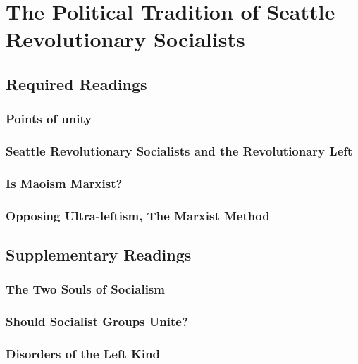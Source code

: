 \documentclass[12pt,a4paper]{report}
\begin{document}
\chapter{The Political Tradition of Seattle Revolutionary Socialists}
\section{Required Readings}
\subsection{Points of unity}

\clearpage

\subsection{Seattle Revolutionary Socialists and the Revolutionary Left}

\clearpage

\subsection{Is Maoism Marxist?}

\clearpage

\subsection{Opposing Ultra-leftism, The Marxist Method}

\clearpage

\section{Supplementary Readings}
\subsection{The Two Souls of Socialism}

\clearpage

\subsection{Should Socialist Groups Unite?}

\clearpage

\subsection{Disorders of the Left Kind}

\clearpage
\end{document}
